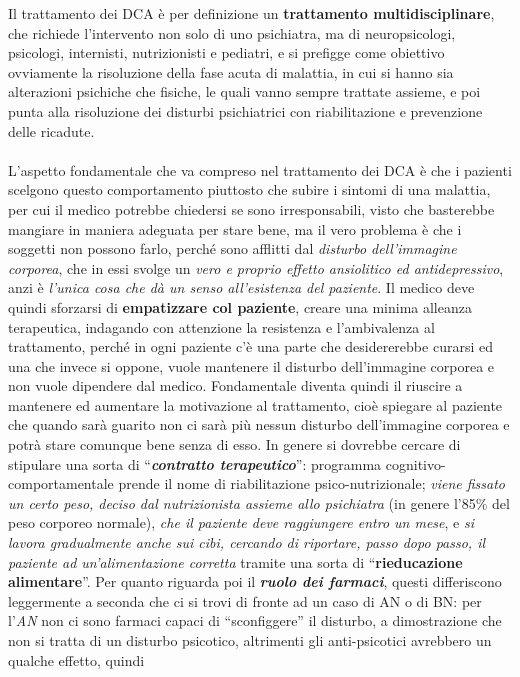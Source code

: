 Il trattamento dei DCA è per definizione un \textbf{trattamento
multidisciplinare}, che richiede l'intervento non solo di uno
psichiatra, ma di neuropsicologi, psicologi, internisti, nutrizionisti e
pediatri, e si prefigge come obiettivo ovviamente la risoluzione della
fase acuta di malattia, in cui si hanno sia alterazioni psichiche che
fisiche, le quali vanno sempre trattate assieme, e poi punta alla
risoluzione dei disturbi psichiatrici con riabilitazione e prevenzione
delle ricadute.
\\\\
L'aspetto fondamentale che va compreso nel trattamento dei DCA è che i
pazienti scelgono questo comportamento piuttosto che subire i sintomi di
una malattia, per cui il medico potrebbe chiedersi se sono
irresponsabili, visto che basterebbe mangiare in maniera adeguata per
stare bene, ma il vero problema è che i soggetti non possono farlo,
perché sono afflitti dal \emph{disturbo dell'immagine corporea}, che in
essi svolge un \emph{vero e proprio effetto ansiolitico ed
antidepressivo}, anzi è \emph{l'unica cosa che dà un senso all'esistenza
del paziente}. Il medico deve quindi sforzarsi di \textbf{empatizzare
col paziente}, creare una minima alleanza terapeutica, indagando con
attenzione la resistenza e l'ambivalenza al trattamento, perché in ogni
paziente c'è una parte che desidererebbe curarsi ed una che invece si
oppone, vuole mantenere il disturbo dell'immagine corporea e non vuole
dipendere dal medico. Fondamentale diventa quindi il riuscire a
mantenere ed aumentare la motivazione al trattamento, cioè spiegare al
paziente che quando sarà guarito non ci sarà più nessun disturbo
dell'immagine corporea e potrà stare comunque bene senza di esso. In
genere si dovrebbe cercare di stipulare una sorta di
``\textbf{\emph{contratto terapeutico}}'': programma
cognitivo-comportamentale prende il nome di riabilitazione
psico-nutrizionale; \emph{viene fissato un certo peso, deciso dal
nutrizionista assieme allo psichiatra} (in genere l'85\% del peso
corporeo normale), \emph{che il paziente deve raggiungere entro un
mese}, e \emph{si lavora gradualmente anche sui cibi, cercando di
riportare, passo dopo passo, il paziente ad un'alimentazione corretta}
tramite una sorta di ``\textbf{rieducazione alimentare}''. Per quanto
riguarda poi il \textbf{\emph{ruolo dei farmaci}}, questi differiscono
leggermente a seconda che ci si trovi di fronte ad un caso di AN o di
BN: per l'\emph{AN} non ci sono farmaci capaci di ``sconfiggere'' il
disturbo, a dimostrazione che non si tratta di un disturbo psicotico,
altrimenti gli anti-psicotici avrebbero un qualche effetto, quindi
